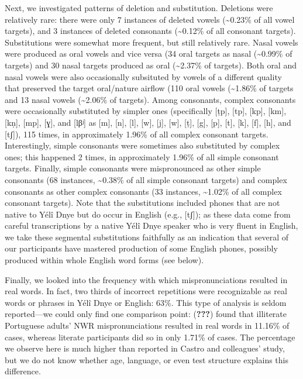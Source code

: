 \documentclass[english,,man,floatsintext]{apa6}
\begin{document}
Next, we investigated patterns of deletion and substitution. Deletions
were relatively rare: there were only 7 instances of deleted vowels
(\textasciitilde{}0.23\% of all vowel targets), and 3 instances of
deleted consonants (\textasciitilde{}0.12\% of all consonant targets).
Substitutions were somewhat more frequent, but still relatively rare.
Nasal vowels were produced as oral vowels and vice versa (34 oral
targets as nasal (\textasciitilde{}0.99\% of targets) and 30 nasal
targets produced as oral (\textasciitilde{}2.37\% of targets). Both oral
and nasal vowels were also occasionally subsituted by vowels of a
different quality that preserved the target oral/nature airflow (110
oral vowels (\textasciitilde{}1.86\% of targets and 13 nasal vowels
(\textasciitilde{}2.06\% of targets). Among consonants, complex
consonants were occasionally substituted by simpler ones (specifically
{[}ṭp{]}, {[}tp{]}, {[}kp{]}, {[}km{]}, {[}kṇ{]}, {[}mp{]}, {[}ɣ{]}, and
{[}lβʲ{]} as {[}m{]}, {[}n{]}, {[}l{]}, {[}w{]}, {[}j{]}, {[}w{]},
{[}ṭ{]}, {[}g{]}, {[}p{]}, {[}t{]}, {[}k{]}, {[}f{]}, {[}h{]}, and
{[}tʃ{]}), 115 times, in approximately 1.96\% of all complex consonant
targets. Interestingly, simple consonants were sometimes also
substituted by complex ones; this happened 2 times, in approximately
1.96\% of all simple consonant targets. Finally, simple consonants were
mispronounced as other simple consonants (68 instances,
\textasciitilde{}0.38\% of all simple consonant targets) and complex
consonants as other complex consonants (33 instances,
\textasciitilde{}1.02\% of all complex consonant targets). Note that the
substitutions included phones that are not native to Yélî Dnye but do
occur in English (e.g., {[}tʃ{]}); as these data come from careful
transcriptions by a native Yélî Dnye speaker who is very fluent in
English, we take these segmental substitutions faithfully as an
indication that several of our participants have mastered production of
some English phones, possibly produced within whole English word forms
(see below).

Finally, we looked into the frequency with which mispronunciations
resulted in real words. In fact, two thirds of incorrect repetitions
were recognizable as real words or phrases in Yélî Dnye or English:
63\%. This type of analysis is seldom reported---we could only find one
comparison point: ({\textbf{???}}) found that illiterate Portuguese
adults' NWR mispronunciations resulted in real words in 11.16\% of
cases, whereas literate participants did so in only 1.71\% of cases. The
percentage we observe here is much higher than reported in Castro and
colleagues' study, but we do not know whether age, language, or even
test structure explains this difference.
\end{document}
